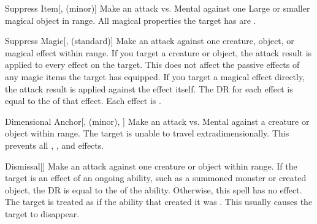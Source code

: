 \lowercase{\hypertarget{spell:Suppress Item}{}}\label{spell:Suppress Item}
\begin{apability}[\nth{1}]{\hypertarget{spell:Suppress Item}{Suppress Item}}[,  (minor)]
Make an attack vs. Mental against one Large or smaller magical object in \rngmed range.
\hit All magical properties the target has are .
\end{apability}
\vspace{0.25em}



\lowercase{\hypertarget{spell:Suppress Magic}{}}\label{spell:Suppress Magic}
\begin{apability}[\nth{1}]{\hypertarget{spell:Suppress Magic}{Suppress Magic}}[,  (standard)]
Make an attack against one creature, object, or magical effect within \rngmed range.
If you target a creature or object, the attack result is applied to every  effect on the target.
This does not affect the passive effects of any magic items the target has equipped.
If you target a magical effect directly, the attack result is applied against the effect itself.
The DR for each effect is equal to the  of that effect.
\hit Each effect is .
\end{apability}
\vspace{0.25em}



\lowercase{\hypertarget{spell:Dimensional Anchor}{}}\label{spell:Dimensional Anchor}
\begin{apability}[\nth{2}]{\hypertarget{spell:Dimensional Anchor}{Dimensional Anchor}}[,  (minor), ]
Make an attack vs. Mental against a creature or object within \rngmed range.
\hit The target is unable to travel extradimensionally.
This prevents all , , and  effects.
\end{apability}
\vspace{0.25em}



\lowercase{\hypertarget{spell:Dismissal}{}}\label{spell:Dismissal}
\begin{apability}[\nth{2}]{\hypertarget{spell:Dismissal}{Dismissal}}[]
Make an attack against one creature or object within \rngmed range.
If the target is an effect of an ongoing  ability, such as a summoned monster or created object, the DR is equal to the  of the ability.
Otherwise, this spell has no effect.
\hit The target is treated as if the ability that created it was .
This usually causes the target to disappear.
\end{apability}
\vspace{0.25em}



